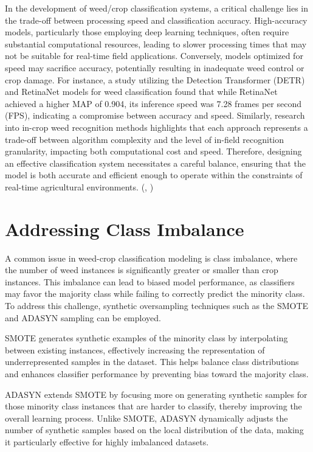 \documentclass[letterpaper, notitlepage]{report}
\begin{document}
In the development of weed/crop classification systems, a critical challenge lies in the trade-off between processing speed and classification accuracy. High-accuracy models, particularly those employing deep learning techniques, often require substantial computational resources, leading to slower processing times that may not be suitable for real-time field applications. Conversely, models optimized for speed may sacrifice accuracy, potentially resulting in inadequate weed control or crop damage. For instance, a study utilizing the Detection Transformer (DETR) and RetinaNet models for weed classification found that while RetinaNet achieved a higher \gls{MAP} of 0.904, its inference speed was 7.28 frames per second (FPS), indicating a compromise between accuracy and speed. Similarly, research into in-crop weed recognition methods highlights that each approach represents a trade-off between algorithm complexity and the level of in-field recognition granularity, impacting both computational cost and speed. Therefore, designing an effective classification system necessitates a careful balance, ensuring that the model is both accurate and efficient enough to operate within the constraints of real-time agricultural environments. (\cite{Islam2025-wd}, \cite{Hu2024-nv})

\section{Addressing Class Imbalance}

A common issue in weed-crop classification modeling is class imbalance, where the number of weed instances is significantly greater or smaller than crop instances. This imbalance can lead to biased model performance, as classifiers may favor the majority class while failing to correctly predict the minority class. To address this challenge, synthetic oversampling techniques such as the \gls{SMOTE} and \gls{ADASYN} sampling can be employed.

SMOTE generates synthetic examples of the minority class by interpolating between existing instances, effectively increasing the representation of underrepresented samples in the dataset. This helps balance class distributions and enhances classifier performance by preventing bias toward the majority class.

ADASYN extends SMOTE by focusing more on generating synthetic samples for those minority class instances that are harder to classify, thereby improving the overall learning process. Unlike SMOTE, ADASYN dynamically adjusts the number of synthetic samples based on the local distribution of the data, making it particularly effective for highly imbalanced datasets.
\end{document}
